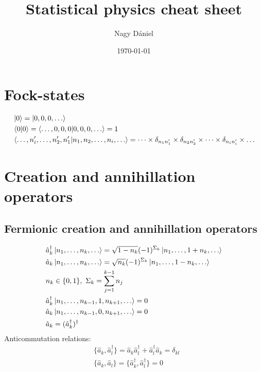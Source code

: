 \documentclass[11pt, a4paper]{article}
\title{Statistical physics cheat sheet}
\author{Nagy Dániel}
\date{\today}
\begin{document}
\maketitle
\newpage

\section{Fock-states}
\begin{align*}
    &\ket 0 = \ket{0,0,0,\dots} \\
    &\braket{0|0} = \braket{\dots,0,0,0|0,0,0,\dots} = 1\\
    &\braket{\dots, n_i', \dots, n_2', n_1' | n_1, n_2, \dots, n_i, \dots}
    = \dots\times\delta_{n_1n_1'}\times\delta_{n_2n_2'}\times\dots\times\delta_{n_in_i'}\times\dots
\end{align*}

\section{Creation and annihillation operators}
\subsection{Fermionic creation and annihillation operators}
\begin{align*}
    &\hat a_k^{\dagger} \ket{n_1, \dots, n_k, \dots} = \sqrt{1-n_k} (-1)^{\Sigma_k} \ket{n_1, \dots, 1 + n_k, \dots} \\
    &\hat a_k \ket{n_1, \dots, n_k, \dots} = \sqrt{n_k} (-1)^{\Sigma_k} \ket{n_1, \dots, 1 - n_k, \dots}\\
    &n_k \in \{0,1\},~ \Sigma_k = \sum\limits_{j=1}^{k-1}n_j \\
    &\hat a_k^{\dagger} \ket{n_1, \dots, n_{k-1}, 1, n_{k+1},\dots} = 0 \\
    &\hat a_k \ket{n_1, \dots, n_{k-1}, 0, n_{k+1},\dots} = 0\\
    &\hat a_k = (\hat a_k^{\dagger})^{\dagger}
\end{align*}
Anticommutation relations:
\begin{align*}
    &\{\hat a_k, \hat a_l^{\dagger}\}  = \hat a_k\hat a_l^{\dagger}+\hat a_l^{\dagger}\hat a_k = \delta_{kl}\\
    &\{\hat a_k, \hat a_l\} = \{ \hat a_k^{\dagger}, \hat a_l^{\dagger} \} = 0
\end{align*}
\end{document}
